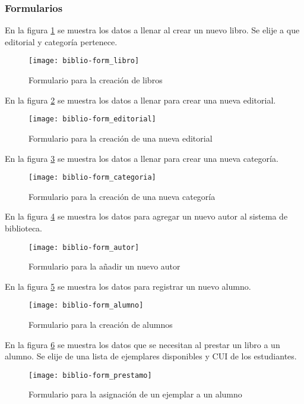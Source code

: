 \subsubsection{Formularios}
En la figura \ref{fig:biblio-form_libro} se muestra los datos a llenar al crear un nuevo libro. Se elije a que editorial y categoría pertenece.
\begin{figure}[H]
  \centering
  \texttt{[image: biblio-form\_libro]}
  \caption{Formulario para la creación de libros}
  \label{fig:biblio-form_libro}
\end{figure}
En la figura \ref{fig:biblio-form_editorial} se muestra los datos a llenar para crear una nueva editorial.
\begin{figure}[H]
  \centering
  \texttt{[image: biblio-form\_editorial]}
  \caption{Formulario para la creación de una nueva editorial}
  \label{fig:biblio-form_editorial}
\end{figure}
En la figura \ref{fig:biblio-form_categoria} se muestra los datos a llenar para crear una nueva categoría.
\begin{figure}[H]
  \centering
  \texttt{[image: biblio-form\_categoria]}
  \caption{Formulario para la creación de una nueva categoría}
  \label{fig:biblio-form_categoria}
\end{figure}
En la figura \ref{fig:biblio-form_autor} se muestra los datos para agregar un nuevo autor al sistema de biblioteca.
\begin{figure}[H]
  \centering
  \texttt{[image: biblio-form\_autor]}
  \caption{Formulario para la añadir un nuevo autor}
  \label{fig:biblio-form_autor}
\end{figure}
En la figura \ref{fig:biblio-form_alumno} se muestra los datos para registrar un nuevo alumno.
\begin{figure}[H]
  \centering
  \texttt{[image: biblio-form\_alumno]}
  \caption{Formulario para la creación de alumnos}
  \label{fig:biblio-form_alumno}
\end{figure}
En la figura \ref{fig:biblio-form_prestamo} se muestra los datos que se necesitan al prestar un libro a un alumno. Se elije de una lista de ejemplares disponibles y CUI de los estudiantes.
\begin{figure}[H]
  \centering
  \texttt{[image: biblio-form\_prestamo]}
  \caption{Formulario para la asignación de un ejemplar a un alumno}
  \label{fig:biblio-form_prestamo}
\end{figure}
